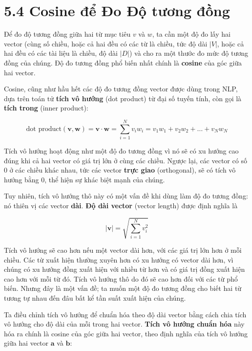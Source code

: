 \section{5.4 Cosine để Đo Độ tương đồng}

Để đo độ tương đồng giữa hai từ mục tiêu $v$ và $w$, ta cần một độ đo lấy hai vector (cùng số chiều, hoặc cả hai đều có các từ là chiều, tức độ dài $|V|$, hoặc cả hai đều có các tài liệu là chiều, độ dài $|D|$) và cho ra một thước đo mức độ tương đồng của chúng. Độ đo tương đồng phổ biến nhất chính là \textbf{cosine} của góc giữa hai vector.

Cosine, cũng như hầu hết các độ đo tương đồng vector được dùng trong NLP, dựa trên toán tử \textbf{tích vô hướng} (dot product) từ đại số tuyến tính, còn gọi là \textbf{tích trong} (inner product):

\begin{equation}
\text{dot product}(\mathbf{v}, \mathbf{w}) = \mathbf{v} \cdot \mathbf{w} = \sum_{i=1}^{N} v_i w_i = v_1 w_1 + v_2 w_2 + \ldots + v_N w_N \tag{5.7}
\end{equation}

Tích vô hướng hoạt động như một độ đo tương đồng vì nó sẽ có xu hướng cao đúng khi cả hai vector có giá trị lớn ở cùng các chiều. Ngược lại, các vector có số 0 ở các chiều khác nhau, tức các vector \textbf{trực giao} (orthogonal), sẽ có tích vô hướng bằng 0, thể hiện sự khác biệt mạnh của chúng.

Tuy nhiên, tích vô hướng thô này có một vấn đề khi dùng làm độ đo tương đồng: nó thiên vị các vector \textbf{dài}. \textbf{Độ dài vector} (vector length) được định nghĩa là

\begin{equation}
|\mathbf{v}| = \sqrt{\sum_{i=1}^{N} v_i^2} \tag{5.8}
\end{equation}

Tích vô hướng sẽ cao hơn nếu một vector dài hơn, với các giá trị lớn hơn ở mỗi chiều. Các từ xuất hiện thường xuyên hơn có xu hướng có vector dài hơn, vì chúng có xu hướng đồng xuất hiện với nhiều từ hơn và có giá trị đồng xuất hiện cao hơn với mỗi từ đó. Tích vô hướng thô do đó sẽ cao hơn đối với các từ phổ biến. Nhưng đây là một vấn đề; ta muốn một độ đo tương đồng cho biết hai từ tương tự nhau đến đâu bất kể tần suất xuất hiện của chúng.

Ta điều chỉnh tích vô hướng để chuẩn hóa theo độ dài vector bằng cách chia tích vô hướng cho độ dài của mỗi trong hai vector. \textbf{Tích vô hướng chuẩn hóa} này hóa ra chính là cosine của góc giữa hai vector, theo định nghĩa của tích vô hướng giữa hai vector $\mathbf{a}$ và $\mathbf{b}$:


